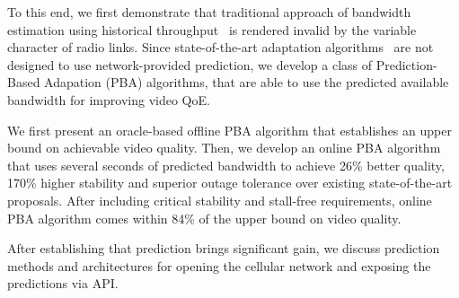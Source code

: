 To this end, we first demonstrate that traditional approach of bandwidth estimation using historical throughput~\cite{Festive} is rendered invalid by the variable character of radio links. 
Since state-of-the-art adaptation algorithms~\cite{BBA,QDASH,Festive} are not designed to use network-provided prediction, we develop a class of Prediction-Based Adapation (PBA) algorithms, that are able to use the predicted available bandwidth for improving video QoE. 

We first present an oracle-based offline PBA algorithm that establishes an upper bound on achievable video quality. Then, we develop an online PBA algorithm that uses several seconds of predicted bandwidth to achieve 26\% better quality, 170\% higher stability and superior outage tolerance over existing state-of-the-art proposals. After including critical stability and stall-free requirements, online PBA algorithm comes within 84\% of the upper bound on video quality. 

After establishing that prediction brings significant gain, we discuss prediction methods and architectures for opening the cellular network and exposing the predictions via API.





